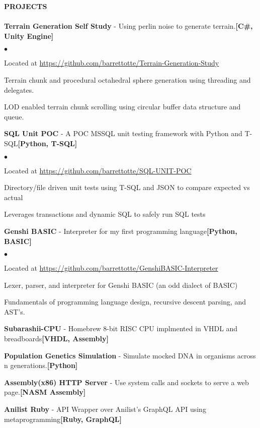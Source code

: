 \documentclass{article}
\newcommand{\lineunder}{
	\vspace*{-4pt}\\ 
	\hspace*{-18pt}\hrulefill \\
}
\newcommand{\header}[1]{
	{\hspace*{-15pt}\vspace*{6pt}\textsc{#1}}\vspace*{-6pt}\lineunder
}
\newcommand{\project}[3]{
	{\textbf{#1} - #2{\hfill\textbf{#3}}\vspace*{3pt}}
}
\newenvironment{resumecontent}{
	\begin{list}
		{\small$\bullet$}{\topsep 0pt \itemsep -2pt}}{\vspace*{4pt}
	\end{list}
}
\newcommand{\resumeheader}[1]{
	\vspace*{5pt}
	\header{\textbf{#1}}
}
\begin{document}
	\resumeheader{PROJECTS}
		\project
			{Terrain Generation Self Study}
			{Using perlin noise to generate terrain.}
			{[C\#, Unity Engine]}
			\begin{resumecontent}
				\item Located at \href{https://github.com/barrettotte/Terrain-Generation-Study}
					{https://github.com/barrettotte/Terrain-Generation-Study}
				\item Terrain chunk and procedural octahedral sphere generation using threading and delegates.
				\item LOD enabled terrain chunk scrolling using circular buffer data structure and queue. 
			\end{resumecontent}
		\project
			{SQL Unit POC}
			{A POC MSSQL unit testing framework with Python and T-SQL} 
			{[Python, T-SQL]}
			\begin{resumecontent}
				\item Located at \href{https://github.com/barrettotte/SQL-UNIT-POC}
					{https://github.com/barrettotte/SQL-UNIT-POC}
				\item Directory/file driven unit tests using T-SQL and JSON to compare expected vs actual
				\item Leverages transactions and dynamic SQL to safely run SQL tests
			\end{resumecontent}
		\project
			{Genshi BASIC}
			{Interpreter for my first programming language}
			{[Python, BASIC]}
			\begin{resumecontent}
				\item Located at \href{https://github.com/barrettotte/GenshiBASIC-Interpreter}
					{https://github.com/barrettotte/GenshiBASIC-Interpreter}
				\item Lexer, parser, and interpreter for Genshi BASIC (an odd dialect of BASIC)
				\item Fundamentals of programming language design, recursive descent parsing, and AST's.
			\end{resumecontent}
		\project
			{Subarashii-CPU}
			{Homebrew 8-bit RISC CPU implmented in VHDL and breadboards} 
			{[VHDL, Assembly]}
		\project
			{Population Genetics Simulation}
			{Simulate mocked DNA in organisms across n generations.}
			{[Python]}
		\project
			{Assembly(x86) HTTP Server}
			{Use system calls and sockets to serve a web page.}
			{[NASM Assembly]}
		\project
			{Anilist Ruby}
			{API Wrapper over Anilist's GraphQL API using metaprogramming}
			{[Ruby, GraphQL]}
\end{document}

